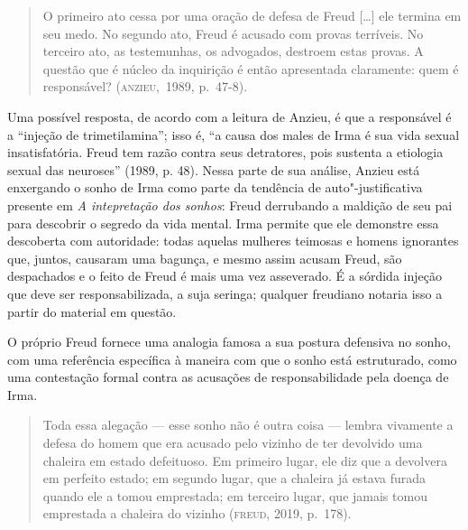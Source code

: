 \begin{quote}
O primeiro ato cessa por uma oração de defesa de Freud {[}\ldots{}{]} ele
termina em seu medo. No segundo ato, Freud é acusado com provas
terríveis. No terceiro ato, as testemunhas, os advogados, destroem estas
provas. A questão que é núcleo da inquirição é então apresentada
claramente: quem é responsável? (\textsc{anzieu},~1989, p.~47-8).
\end{quote}

Uma possível resposta, de acordo com a leitura de Anzieu, é que a
responsável é a ``injeção de trimetilamina''; isso é, ``a causa dos
males de Irma é sua vida sexual insatisfatória. Freud tem razão contra
seus detratores, pois sustenta a etiologia sexual das neuroses'' (1989, p.
48). Nessa parte de sua análise, Anzieu está enxergando o sonho de Irma
como parte da tendência de auto"-justificativa presente em \emph{A
intepretação dos sonhos}: Freud derrubando a maldição de seu pai para
descobrir o segredo da vida mental. Irma permite que ele demonstre essa
descoberta com autoridade: todas aquelas mulheres teimosas e homens
ignorantes que, juntos, causaram uma bagunça, e mesmo assim acusam
Freud, são despachados e o feito de Freud é mais uma vez asseverado. É a
sórdida injeção que deve ser responsabilizada, a suja seringa; qualquer
freudiano notaria isso a partir do material em questão.

O próprio Freud fornece uma analogia famosa a sua postura defensiva no
sonho, com uma referência específica à maneira com que o sonho está
estruturado, como uma contestação formal contra as acusações de
responsabilidade pela doença de Irma.

\begin{quote}
Toda essa alegação --- esse sonho não é outra coisa --- lembra vivamente a
defesa do homem que era acusado pelo vizinho de ter devolvido uma
chaleira em estado defeituoso. Em primeiro lugar, ele diz que a
devolvera em perfeito estado; em segundo lugar, que a chaleira já estava
furada quando ele a tomou emprestada; em terceiro lugar, que jamais
tomou emprestada a chaleira do vizinho (\textsc{freud}, 2019, p.~178).
\end{quote}

